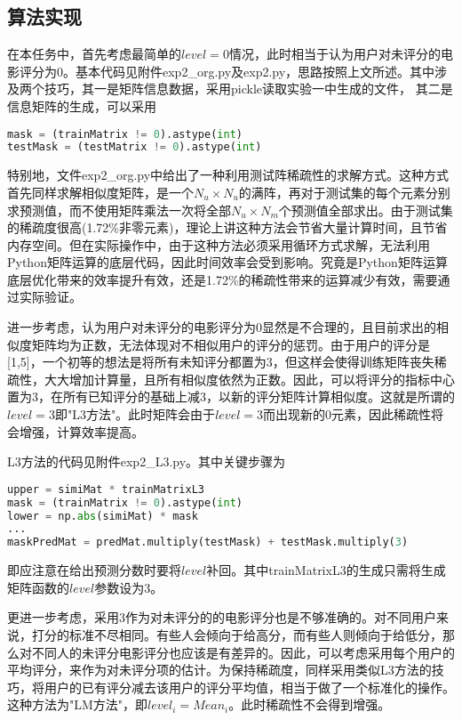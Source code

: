 \documentclass[a4paper,12pt]{article}
\begin{document}
    \subsection{算法实现}
    \label{exp2alg}
    在本任务中，首先考虑最简单的$level=0$情况，此时相当于认为用户对未评分的电影评分为0。基本代码见附件exp2\_org.py及exp2.py，思路按照上文所述。其中涉及两个技巧，其一是矩阵信息数据，采用pickle读取实验一中生成的文件，
    其二是信息矩阵的生成，可以采用
    \begin{lstlisting}[language=python]
mask = (trainMatrix != 0).astype(int)
testMask = (testMatrix != 0).astype(int)
    \end{lstlisting}

    特别地，文件exp2\_org.py中给出了一种利用测试阵稀疏性的求解方式。这种方式首先同样求解相似度矩阵，是一个$N_u\times N_u$的满阵，再对于测试集的每个元素分别求预测值，而不使用矩阵乘法一次将全部$N_u\times N_m$个预测值全部求出。由于测试集的稀疏度很高(1.72\%非零元素)，理论上讲这种方法会节省大量计算时间，且节省内存空间。但在实际操作中，由于这种方法必须采用循环方式求解，无法利用Python矩阵运算的底层代码，因此时间效率会受到影响。究竟是Python矩阵运算底层优化带来的效率提升有效，还是1.72\%的稀疏性带来的运算减少有效，需要通过实际验证。

    进一步考虑，认为用户对未评分的电影评分为0显然是不合理的，且目前求出的相似度矩阵均为正数，无法体现对不相似用户的评分的惩罚。由于用户的评分是[1,5]，一个初等的想法是将所有未知评分都置为3，但这样会使得训练矩阵丧失稀疏性，大大增加计算量，且所有相似度依然为正数。因此，可以将评分的指标中心置为3，在所有已知评分的基础上减3，以新的评分矩阵计算相似度。这就是所谓的$level=3$即"L3方法"。此时矩阵会由于$level=3$而出现新的0元素，因此稀疏性将会增强，计算效率提高。

    L3方法的代码见附件exp2\_L3.py。其中关键步骤为
    \begin{lstlisting}[language=python]
upper = simiMat * trainMatrixL3
mask = (trainMatrix != 0).astype(int)
lower = np.abs(simiMat) * mask
...
maskPredMat = predMat.multiply(testMask) + testMask.multiply(3)
    \end{lstlisting}
    即应注意在给出预测分数时要将$level$补回。其中trainMatrixL3的生成只需将生成矩阵函数的$level$参数设为3。

    更进一步考虑，采用3作为对未评分的的电影评分也是不够准确的。对不同用户来说，打分的标准不尽相同。有些人会倾向于给高分，而有些人则倾向于给低分，那么对不同人的未评分电影评分也应该是有差异的。因此，可以考虑采用每个用户的平均评分，来作为对未评分项的估计。为保持稀疏度，同样采用类似L3方法的技巧，将用户的已有评分减去该用户的评分平均值，相当于做了一个标准化的操作。这种方法为"LM方法"，即$level_i=Mean_i$。此时稀疏性不会得到增强。
\end{document}
